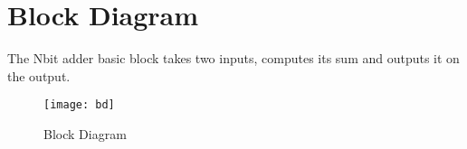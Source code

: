 \section{Block Diagram}

The Nbit adder basic block takes two inputs, computes its sum and outputs it on the output.  

\begin{figure}[!htbp]
    \centerline{\texttt{[image: bd]}}
    \vspace{0cm}\caption{Block Diagram}
    \label{fig:bd}
\end{figure}



